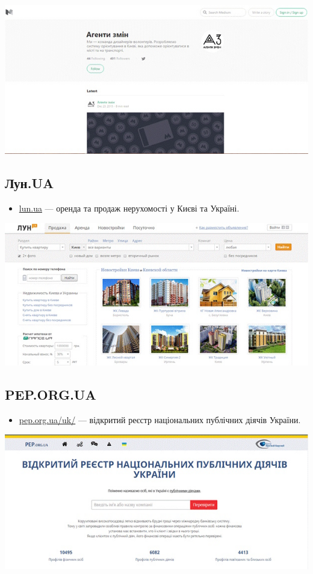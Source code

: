 \includegraphics{images/022.jpg}

\subsection{Лун.UA}

\begin{itemize}
    \item \href{http://www.lun.ua/}{lun.ua} — оренда та продаж нерухомості у Києві та Україні.
\end{itemize}

\includegraphics{images/023.jpg}

\subsection{PEP.ORG.UA}

\begin{itemize}
    \item \href{http://pep.org.ua/uk/}{pep.org.ua/uk/} — відкритий реєстр національних публічних діячів України.
\end{itemize}

\includegraphics{images/024.jpg}

